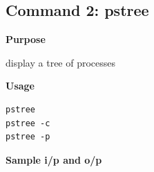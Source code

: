 \subsection{Command 2: pstree} 
\textbf{Purpose}
\begin{flushleft}
display a tree of processes
\end{flushleft}
\textbf{Usage}
\begin{verbatim}
pstree
pstree -c
pstree -p
\end{verbatim}
\textbf{Sample i/p and o/p}
\begin{figure}[H] 
\end{figure}
